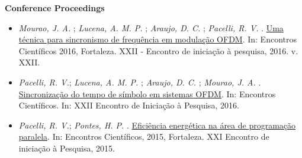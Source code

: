 \textbf{Conference Proceedings}
\begin{itemize}[label={-}]
    \item \textit{Mourao, J. A.} ; \textit{Lucena, A. M. P.} ; \textit{Araujo, D. C.} ; \textit{Pacelli, R. V.} . \href{https://uol.unifor.br/oul/conteudosite/?cdConteudo=6946081}{Uma técnica para sincronismo de frequência em modulação OFDM}. In: Encontros Científicos 2016, Fortaleza. XXII - Encontro de iniciação à pesquisa, 2016. v. XXII.
    \item \textit{Pacelli, R. V.}; \textit{Lucena, A. M. P.} ; \textit{Araujo, D. C.} ; \textit{Mourao, J. A.} . \href{https://uol.unifor.br/oul/conteudosite/?cdConteudo=6949723}{Sincronização do tempo de símbolo em sistemas OFDM}. In: Encontros Científicos. In: XXII Encontro de Iniciação à Pesquisa, 2016.
    \item \textit{Pacelli, R. V.}; \textit{Pontes, H. P.} . \href{https://uol.unifor.br/oul/conteudosite/?cdConteudo=6111841}{Eficiência energética na área de programação paralela}. In: Encontros Científicos, 2015, Fortaleza. XXI Encontro de iniciação à Pesquisa, 2015.
\end{itemize}